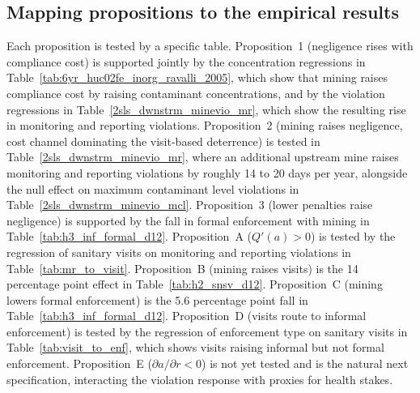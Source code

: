\subsection{Mapping propositions to the empirical results}

Each proposition is tested by a specific table. Proposition~1 (negligence rises with compliance cost) is supported jointly by the concentration regressions in Table~\ref{tab:6yr_huc02fe_inorg_ravalli_2005}, which show that mining raises compliance cost by raising contaminant concentrations, and by the violation regressions in Table~\ref{2sls_dwnstrm_minevio_mr}, which show the resulting rise in monitoring and reporting violations. Proposition~2 (mining raises negligence, cost channel dominating the visit-based deterrence) is tested in Table~\ref{2sls_dwnstrm_minevio_mr}, where an additional upstream mine raises monitoring and reporting violations by roughly 14 to 20 days per year, alongside the null effect on maximum contaminant level violations in Table~\ref{2sls_dwnstrm_minevio_mcl}. Proposition~3 (lower penalties raise negligence) is supported by the fall in formal enforcement with mining in Table~\ref{tab:h3_inf_formal_d12}. Proposition~A ($Q'(a)>0$) is tested by the regression of sanitary visits on monitoring and reporting violations in Table~\ref{tab:mr_to_visit}. Proposition~B (mining raises visits) is the 14 percentage point effect in Table~\ref{tab:h2_snsv_d12}. Proposition~C (mining lowers formal enforcement) is the 5.6 percentage point fall in Table~\ref{tab:h3_inf_formal_d12}. Proposition~D (visits route to informal enforcement) is tested by the regression of enforcement type on sanitary visits in Table~\ref{tab:visit_to_enf}, which shows visits raising informal but not formal enforcement. Proposition~E ($\partial a/\partial r < 0$) is not yet tested and is the natural next specification, interacting the violation response with proxies for health stakes.
